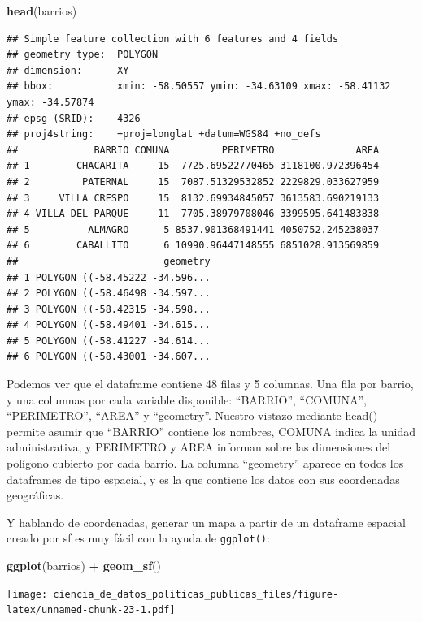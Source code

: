 \documentclass[]{book}
\newenvironment{Shaded}{\begin{snugshade}}{\end{snugshade}}
\newcommand{\KeywordTok}[1]{\textcolor[rgb]{0.13,0.29,0.53}{\textbf{#1}}}
\newcommand{\StringTok}[1]{\textcolor[rgb]{0.31,0.60,0.02}{#1}}
\newcommand{\OperatorTok}[1]{\textcolor[rgb]{0.81,0.36,0.00}{\textbf{#1}}}
\newcommand{\NormalTok}[1]{#1}
\begin{document}
\begin{Shaded}
\begin{Highlighting}[]
\KeywordTok{head}\NormalTok{(barrios)}
\end{Highlighting}
\end{Shaded}

\begin{verbatim}
## Simple feature collection with 6 features and 4 fields
## geometry type:  POLYGON
## dimension:      XY
## bbox:           xmin: -58.50557 ymin: -34.63109 xmax: -58.41132 ymax: -34.57874
## epsg (SRID):    4326
## proj4string:    +proj=longlat +datum=WGS84 +no_defs
##             BARRIO COMUNA         PERIMETRO              AREA
## 1        CHACARITA     15  7725.69522770465 3118100.972396454
## 2         PATERNAL     15  7087.51329532852 2229829.033627959
## 3     VILLA CRESPO     15  8132.69934845057 3613583.690219133
## 4 VILLA DEL PARQUE     11  7705.38979708046 3399595.641483838
## 5          ALMAGRO      5 8537.901368491441 4050752.245238037
## 6        CABALLITO      6 10990.96447148555 6851028.913569859
##                         geometry
## 1 POLYGON ((-58.45222 -34.596...
## 2 POLYGON ((-58.46498 -34.597...
## 3 POLYGON ((-58.42315 -34.598...
## 4 POLYGON ((-58.49401 -34.615...
## 5 POLYGON ((-58.41227 -34.614...
## 6 POLYGON ((-58.43001 -34.607...
\end{verbatim}

Podemos ver que el dataframe contiene 48 filas y 5 columnas. Una fila
por barrio, y una columnas por cada variable disponible: ``BARRIO'',
``COMUNA'', ``PERIMETRO'', ``AREA'' y ``geometry''. Nuestro vistazo
mediante head() permite asumir que ``BARRIO'' contiene los nombres,
COMUNA indica la unidad administrativa, y PERIMETRO y AREA informan
sobre las dimensiones del polígono cubierto por cada barrio. La columna
``geometry'' aparece en todos los dataframes de tipo espacial, y es la
que contiene los datos con sus coordenadas geográficas.

Y hablando de coordenadas, generar un mapa a partir de un dataframe
espacial creado por sf es muy fácil con la ayuda de \texttt{ggplot()}:

\begin{Shaded}
\begin{Highlighting}[]
\KeywordTok{ggplot}\NormalTok{(barrios) }\OperatorTok{+}
\StringTok{    }\KeywordTok{geom_sf}\NormalTok{()}
\end{Highlighting}
\end{Shaded}

\texttt{[image: ciencia\_de\_datos\_politicas\_publicas\_files/figure-latex/unnamed-chunk-23-1.pdf]}
\end{document}
